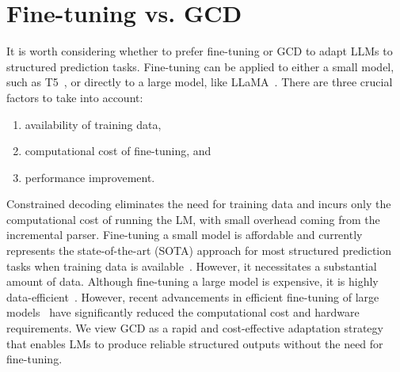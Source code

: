 \section{Fine-tuning vs. GCD}\label{app_sec:finetuning_vs_gcd}
It is worth considering whether to prefer fine-tuning or GCD to adapt LLMs to structured prediction tasks. Fine-tuning can be applied to either a small model, such as T5~\cite{DBLP:journals/corr/abs-1910-10683}, or directly to a large model, like LLaMA~\cite{touvron2023llama}.
%
There are three crucial factors to take into account:
\begin{enumerate}
    \denselist
    \item availability of training data,
    \item computational cost of fine-tuning, and
    \item performance improvement.
\end{enumerate}
%
Constrained decoding eliminates the need for training data and incurs only the computational cost of running the LM, with small overhead coming from the incremental parser.
%
Fine-tuning a small model is affordable and currently represents the state-of-the-art (SOTA) approach for most structured prediction tasks when training data is available~\cite{decao2021autoregressive, jimenez-gutierrez-etal-2022-thinking}. However, it necessitates a substantial amount of data.
%
Although fine-tuning a large model is expensive, it is highly data-efficient~\cite{brown2020language}.
However, recent advancements in efficient fine-tuning of large models~\cite{hu2021lora} have significantly reduced the computational cost and hardware requirements.
%
We view GCD as a rapid and cost-effective adaptation strategy that enables LMs to produce reliable structured outputs without the need for fine-tuning.
